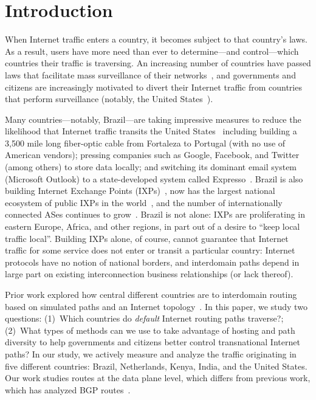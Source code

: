\section{Introduction}
\label{intro}

When Internet traffic enters a country, it becomes subject to that
country's laws.  As a result, users have more need than ever to
determine---and control---which countries their traffic is traversing.
An increasing number of countries have passed laws that facilitate mass
surveillance of their networks~\cite{france_surveillance,
  netherlands_surveillance, kazak_surveillance, uk_bill}, and governments
and citizens are increasingly motivated to divert their Internet traffic
from countries that perform surveillance (notably, the United
States~\cite{russia_secure_internet,
  routing_errors, dte}).

Many countries---notably, Brazil---are taking impressive measures to reduce
the likelihood that Internet traffic transits the United
States~\cite{brazil_history, brazil_break_from_US, brazil_conference,
  brazil_conference2, brazil_human_rights} including building a 3,500
mile long fiber-optic cable from Fortaleza to Portugal (with no use of
American vendors); pressing companies such as Google, Facebook, and
Twitter (among others) to store data locally; and switching its dominant
email system (Microsoft Outlook) to a state-developed system called
Expresso~\cite{brazil_cable, brazil_us_companies}.  Brazil is also
building Internet Exchange Points (IXPs)~\cite{brazil_IXP1}, now has the
largest national ecosystem of public IXPs in
the world~\cite{brazil_ixp_ecosystem}, and the number of internationally
connected ASes continues to
grow~\cite{brazil_international_ases}. Brazil is not alone: IXPs are
proliferating in eastern Europe, Africa, and other regions, in part out
of a desire to ``keep local traffic local''. Building IXPs alone, of
course, cannot guarantee that Internet traffic for some service does not
enter or transit a particular country: Internet protocols have no notion
of national borders, and interdomain paths depend in large part on
existing interconnection business relationships (or lack thereof). 

Prior work explored how central different countries are to interdomain 
routing based on simulated paths and an Internet topology~\cite{karlin2009nation}. 
In this paper, we study two questions: (1)~Which countries do {\em
  default} Internet routing paths traverse?; (2)~What types of methods
can we use to take advantage of hosting and path diversity to help governments
and citizens better control transnational Internet paths? 
In our study, we actively measure and analyze the traffic originating in
five different countries: Brazil, Netherlands, Kenya, India, and the
United States.  Our work studies routes at the data plane level, which differs from 
 previous work, which has analyzed BGP routes~\cite{karlin2009nation,shah2015characterizing}.

